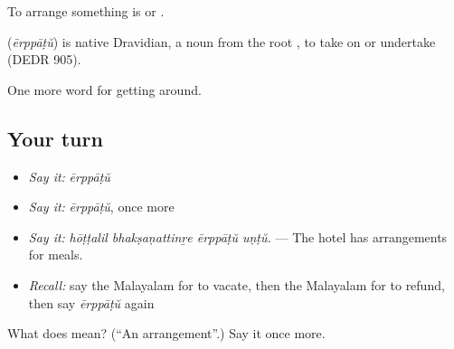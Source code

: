 To arrange something is   or .

\begin{cousinweb}
\textbf{} (\emph{ērppāṭŭ}) is native Dravidian, a noun from the root , to take on or undertake (DEDR 905).
\end{cousinweb}

\begin{grammarlens}[title={What you've built}]
One more word for getting around.
\end{grammarlens}

\subsection*{Your turn}
\begin{itemize}
\raggedright
  \item \emph{Say it:} \emph{ērppāṭŭ}
  \item \emph{Say it:} \emph{ērppāṭŭ}, once more
  \item \emph{Say it:} \emph{hōṭṭalil bhakṣaṇattinṟe ērppāṭŭ uṇṭŭ.} — The hotel has arrangements for meals.
  \item \emph{Recall:} say the Malayalam for to vacate, then the Malayalam for to refund, then say \emph{ērppāṭŭ} again
\end{itemize}

\begin{tcolorbox}[breakable,colback=teal!4,colframe=teal!35!black,title={Before you move on}]
What does  mean? (\textquotedblleft{}An arrangement\textquotedblright{}.) Say it once more.
\end{tcolorbox}
